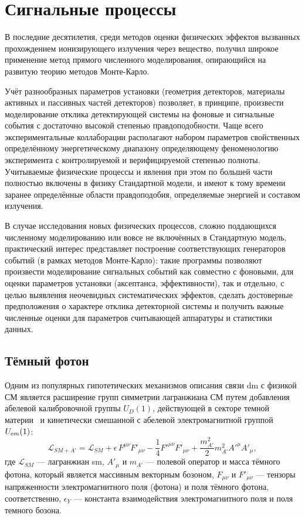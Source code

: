 \section{Сигнальные процессы}

В последние десятилетия, среди методов оценки физических эффектов вызванных
прохождением ионизирующего излучения через вещество, получил широкое применение
метод прямого численного моделирования, опирающийся на развитую теорию
методов Монте-Карло.

Учёт разнообразных параметров установки (геометрия детекторов, материалы
активных и пассивных частей детекторов) позволяет, в принципе, произвести
моделирование отклика детектирующей системы на фоновые и сигнальные события с
достаточно высокой степенью правдоподобности. Чаще всего экспериментальные
коллаборации располагают набором параметров свойственных определённому
энергетическому диапазону определяющему феноменологию эксперимента с
контролируемой и верифицируемой степенью полноты.
Учитываемые физические
процессы и явления при этом по большей части полностью включены в физику
Стандартной модели, и имеют к тому времени заранее определённые области
правдоподобия, определяемые энергией и составом излучения.

В случае исследования новых физических процессов, сложно поддающихся численному
моделированию или вовсе не включённых в Стандартную модель, практический
интерес представляет построение соответствующих генераторов событий (в рамках
методов Монте-Карло): такие программы позволяют произвести моделирование
сигнальных событий как совместно с фоновыми, для оценки параметров установки
(аксептанса, эффективности), так и отдельно, с целью выявления неочевидных
систематических эффектов, сделать достоверные предположения о характере отклика
детекторной системы и получить важные численные оценки для параметров
считывающей аппаратуры и статистики данных.

\subsection{Тёмный фотон}

Одним из популярных гипотетических механизмов описания связи \acrshort{dm}
с физикой СМ является расширение групп симметрии 
лагранжиана СМ путем добавления абелевой калибровочной группы $U_D(1)$, 
действующей в секторе темной материи~\cite{holdom} и кинетически смешанной 
с абелевой электромагнитной группой $U_{\textrm em}(1)$:
\begin{equation}
\label{LCM_A}
    \mathcal{L}_{SM+A'} = \mathcal{L}_{SM} + \epsilon \, F^{\mu\nu} F'_{\mu \nu}
        - \frac{1}{4} F'^{\mu\nu} F'_{\mu\nu} + \frac{m_{A'}^2}{2} m_{A'}^2 A'^{\mu}A'_{\mu},
\end{equation}
где
$\mathcal{L}_{SM}$ --- лагранжиан \acrshort{sm}, 
$A'_{\mu}$ и $m_{A'}$ --- полевой оператор и масса тёмного фотона, 
который является массивным векторным бозоном, 
$F_{\mu \nu}$ и $F'_{\mu \nu}$ --- тензоры напряженности 
электромагнитного поля (фотона) и поля тёмного фотона, соответственно,
$\epsilon_Y$ --- константа взаимодействия  
электромагнитного поля и поля темного бозона. 

